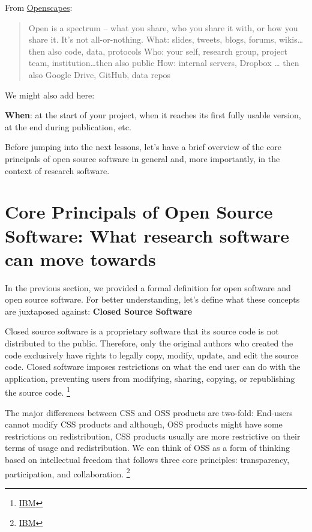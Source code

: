 \documentclass[
  letterpaper,
  DIV=11,
  numbers=noendperiod]{scrreport}
\providecommand{\tightlist}{%
  \setlength{\itemsep}{0pt}\setlength{\parskip}{0pt}}\usepackage{longtable,booktabs,array}
\begin{document}
From
\href{https://openscapes.github.io/series/mindset.html\#open-as-a-way-to-work}{Openscapes}:

\begin{quote}
Open is a spectrum -- what you share, who you share it with, or how you
share it. It's not all-or-nothing. What: slides, tweets, blogs, forums,
wikis\ldots{} then also code, data, protocols Who: your self, research
group, project team, institution\ldots then also public How: internal
servers, Dropbox \ldots{} then also Google Drive, GitHub, data repos
\end{quote}

We might also add here:

\textbf{When}: at the start of your project, when it reaches its first
fully usable version, at the end during publication, etc.

Before jumping into the next lessons, let's have a brief overview of the
core principals of open source software in general and, more
importantly, in the context of research software.

\hypertarget{core-principals-of-open-source-software-what-research-software-can-move-towards}{%
\section{Core Principals of Open Source Software: What research software
can move
towards}\label{core-principals-of-open-source-software-what-research-software-can-move-towards}}

In the previous section, we provided a formal definition for open
software and open source software. For better understanding, let's
define what these concepts are juxtaposed against: \textbf{Closed Source
Software}

\begin{description}
\tightlist
\item[Closed Source Software (CSS)]
Closed source software is a proprietary software that its source code is
not distributed to the public. Therefore, only the original authors who
created the code exclusively have rights to legally copy, modify,
update, and edit the source code. Closed software imposes restrictions
on what the end user can do with the application, preventing users from
modifying, sharing, copying, or republishing the source code.
\footnote{\href{https://www.ibm.com/topics/open-source}{IBM}}
\end{description}

The major differences between CSS and OSS products are two-fold:
End-users cannot modify CSS products and although, OSS products might
have some restrictions on redistribution, CSS products usually are more
restrictive on their terms of usage and redistribution. We can think of
OSS as a form of thinking based on intellectual freedom that follows
three core principles: transparency, participation, and collaboration.
\footnote{\href{https://www.ibm.com/topics/open-source}{IBM}}
\end{document}
